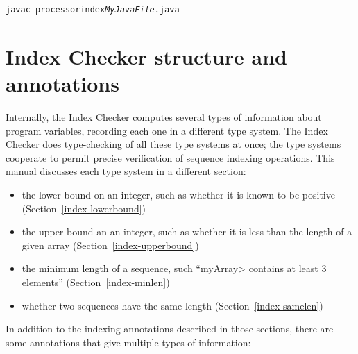 \begin{alltt}
  javac -processor index \emph{MyJavaFile}.java
\end{alltt}


\section{Index Checker structure and annotations\label{index-annotations}}

Internally, the Index Checker computes several types of information about
program variables, recording each one in a different type system.  The
Index Checker does type-checking of all these type systems at once; the
type systems cooperate to permit precise verification of sequence indexing
operations.  This manual discusses each type system in a different
section:
\begin{itemize}
\item
  the lower bound on an integer, such as whether it is known to be positive
  (Section~\ref{index-lowerbound})
\item
  the upper bound an an integer, such as whether it is less than the length
  of a given array (Section~\ref{index-upperbound})
\item
  the minimum length of a sequence, such ``\<myArray> contains at least 3
  elements'' (Section~\ref{index-minlen})
\item
  whether two sequences have the same length (Section~\ref{index-samelen})
\end{itemize}

In addition to the indexing annotations described in those sections, there
are some annotations that give multiple types of information:

